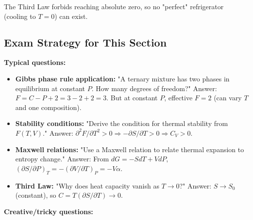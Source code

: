 \documentclass[9pt,twocoloumn]{article}
\begin{document}
The Third Law forbids reaching absolute zero, so no "perfect" refrigerator (cooling to $T = 0$) can exist.

\subsection{Exam Strategy for This Section}

\textbf{Typical questions:}

\begin{itemize}
    \item \textbf{Gibbs phase rule application:} "A ternary mixture has two phases in equilibrium at constant $P$. How many degrees of freedom?" Answer: $F = C - P + 2 = 3 - 2 + 2 = 3$. But at constant $P$, effective $F = 2$ (can vary $T$ and one composition).

    \item \textbf{Stability conditions:} "Derive the condition for thermal stability from $F(T, V)$." Answer: $\partial^2 F/\partial T^2 > 0 \Rightarrow -\partial S/\partial T > 0 \Rightarrow C_V > 0$.

    \item \textbf{Maxwell relations:} "Use a Maxwell relation to relate thermal expansion to entropy change." Answer: From $dG = -S dT + V dP$, $(\partial S/\partial P)_T = -(\partial V/\partial T)_P = -V\alpha$.

    \item \textbf{Third Law:} "Why does heat capacity vanish as $T \to 0$?" Answer: $S \to S_0$ (constant), so $C = T(\partial S/\partial T) \to 0$.
\end{itemize}

\textbf{Creative/tricky questions:}
\end{document}
